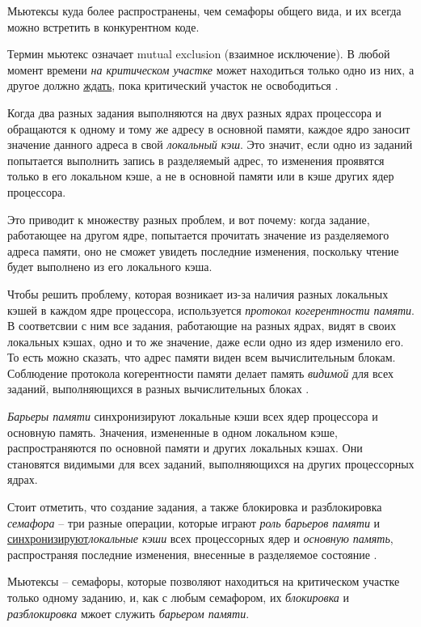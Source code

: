 \documentclass[%
	11pt,
	a4paper,
	utf8,
		]{article}
\begin{document}
Мьютексы куда более распространены, чем семафоры общего вида, и их всегда можно встретить в конкурентном коде.

Термин мьютекс означает mutual exclusion (взаимное исключение). В любой момент времени \emph{на критическом участке} может находиться только одно из них, а другое должно \underline{ждать}, пока критический участок не освободиться \cite[]{amini-extreme-c:2022}.

Когда два разных задания выполняются на двух разных ядрах процессора и обращаются к одному и тому же адресу в основной памяти, каждое ядро заносит значение данного адреса в свой \emph{локальный кэш}. Это значит, если одно из заданий попытается выполнить запись в разделяемый адрес, то изменения проявятся только в его локальном кэше, а не в основной памяти или в кэше других ядер процессора.

Это приводит к множеству разных проблем, и вот почему: когда задание, работающее на другом ядре, попытается прочитать значение из разделяемого адреса памяти, оно не сможет увидеть последние изменения, поскольку чтение будет выполнено из его локального кэша.

Чтобы решить проблему, которая возникает из-за наличия разных локальных кэшей в каждом ядре процессора, используется \emph{протокол когерентности памяти}. В соответсвии с ним все задания, работающие на разных ядрах, видят в своих локальных кэшах, одно и то же значение, даже если одно из ядер изменило его. То есть можно сказать, что адрес памяти виден всем вычислительным блокам. Соблюдение протокола когерентности памяти делает память \emph{видимой} для всех заданий, выполняющихся в разных вычислительных блоках \cite[]{amini-extreme-c:2022}.

\emph{Барьеры памяти} синхронизируют локальные кэши всех ядер процессора и основную память. Значения, измененные в одном локальном кэше, распространяются по основной памяти и других локальных кэшах. Они становятся видимыми для всех заданий, выполняющихся на других процессорных ядрах.

Стоит отметить, что создание задания, а также блокировка и разблокировка \emph{семафора} -- три разные операции, которые играют \emph{роль барьеров памяти} и {\color{blue}\underline{синхронизируют}\emph{локальные кэши} всех процессорных ядер и \emph{основную память}}, распространяя последние изменения, внесенные в разделяемое состояние \cite[]{amini-extreme-c:2022}.

Мьютексы -- семафоры, которые позволяют находиться на критическом участке только одному заданию, и, как с любым семафором, их \emph{блокировка} и \emph{разблокировка} мжоет служить \emph{барьером памяти}.
\end{document}
